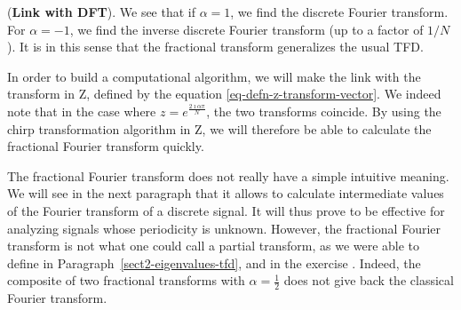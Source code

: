  
\begin{rem}{(\upshape \textbf{Link with DFT}).} 
We see that if $ \alpha = 1 $, we find the discrete Fourier transform. For $ \alpha = -1 $, we find the inverse discrete Fourier transform (up to a factor of $ 1 / N $). It is in this sense that the fractional transform generalizes the usual TFD.
\end{rem}
 
 
 
In order to build a computational algorithm, we will make the link with the transform in Z, defined by the equation \eqref{eq-defn-z-transform-vector}. We indeed note that in the case where $ z = e^{\frac{2 \imath \alpha \pi}{N}} $, the two transforms coincide. By using the chirp transformation algorithm in Z, we will therefore be able to calculate the fractional Fourier transform quickly.
 
 
The fractional Fourier transform does not really have a simple intuitive meaning. We will see in the next paragraph that it allows to calculate intermediate values of the Fourier transform of a discrete signal. It will thus prove to be effective for analyzing signals whose periodicity is unknown. However, the fractional Fourier transform is not what one could call a partial transform, as we were able to define in Paragraph~\ref{sect2-eigenvalues-tfd}, and in the exercise . Indeed, the composite of two fractional transforms with $ \alpha = \frac{1}{2} $ does not give back the classical Fourier transform.
 
